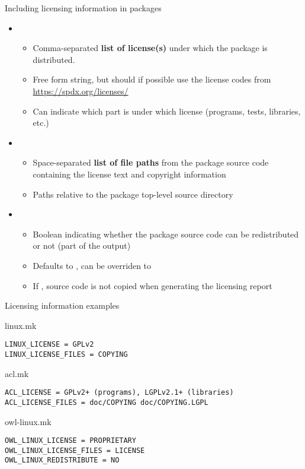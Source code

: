 \begin{frame}{Including licensing information in packages}
  \begin{itemize}
  \item {}
    \begin{itemize}
    \item Comma-separated {\bf list of license(s)} under which the
      package is distributed.
    \item Free form string, but should if possible use the license
      codes from \url{https://spdx.org/licenses/}
    \item Can indicate which part is under which license (programs,
      tests, libraries, etc.)
    \end{itemize}
  \item {}
    \begin{itemize}
    \item Space-separated {\bf list of file paths} from the package
      source code containing the license text and copyright
      information
    \item Paths relative to the package top-level source directory
    \end{itemize}
  \item {}
    \begin{itemize}
    \item Boolean indicating whether the package source code can be
      redistributed or not (part of the  output)
    \item Defaults to , can be overriden to 
    \item If , source code is not copied when generating the
      licensing report
    \end{itemize}
  \end{itemize}
\end{frame}

\begin{frame}[fragile]{Licensing information examples}
  \begin{block}{linux.mk}
\begin{verbatim}
LINUX_LICENSE = GPLv2
LINUX_LICENSE_FILES = COPYING
\end{verbatim}
  \end{block}

\begin{block}{acl.mk}
\begin{verbatim}
ACL_LICENSE = GPLv2+ (programs), LGPLv2.1+ (libraries)
ACL_LICENSE_FILES = doc/COPYING doc/COPYING.LGPL
\end{verbatim}
\end{block}

\begin{block}{owl-linux.mk}
\begin{verbatim}
OWL_LINUX_LICENSE = PROPRIETARY
OWL_LINUX_LICENSE_FILES = LICENSE
OWL_LINUX_REDISTRIBUTE = NO
\end{verbatim}
\end{block}

\end{frame}

